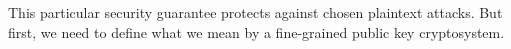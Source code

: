 %
%
%		

This particular security guarantee protects against chosen plaintext attacks. But first, we need to define what we mean by a fine-grained public key cryptosystem.

